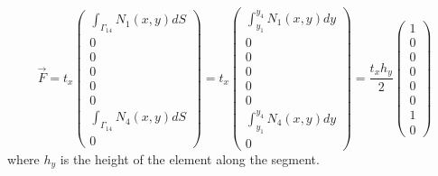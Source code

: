 \[
\vec{F}=
t_x
\left(
\begin{array}{c}
\int_{\Gamma_{14}}  N_1(x,y)  dS\\
0 \\
0 \\ 0 \\ 0 \\ 0 \\
\int_{\Gamma_{14}} N_4(x,y)  dS\\
0
\end{array}
\right)
=
t_x
\left(
\begin{array}{c}
\int_{y_1}^{y_4} N_1(x,y) dy\\
0 \\
0 \\ 0 \\ 0 \\ 0 \\
\int_{y_1}^{y_4} N_4(x,y) dy\\
0
\end{array}
\right)
=
\frac{t_x h_y}{2}
\left(
\begin{array}{c}
1 \\
0 \\
0 \\ 0 \\ 0 \\ 0 \\
1 \\
0
\end{array}
\right)
\]
where $h_y$ is the height of the element along the segment. 




